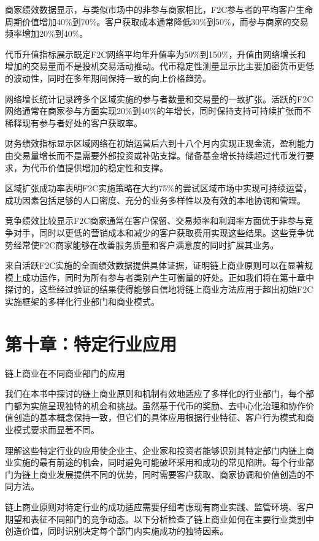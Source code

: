\documentclass[
  Letterpaper,
]{scrbook}
\begin{document}
商家绩效数据显示，与类似市场中的非参与商家相比，F2C参与者的平均客户生命周期价值增加40\%到70\%。客户获取成本通常降低30\%到50\%，而参与商家的交易频率增加20\%到40\%。

代币升值指标展示既定F2C网络平均年升值率为50\%到150\%，升值由网络增长和增加的交易量而不是投机交易活动推动。代币稳定性测量显示比主要加密货币更低的波动性，同时在多年期间保持一致的向上价格趋势。

网络增长统计记录跨多个区域实施的参与者数量和交易量的一致扩张。活跃的F2C网络通常在商家参与方面实现20\%到40\%的年增长，同时保持支持可持续扩张而不稀释现有参与者好处的客户获取率。

财务绩效指标显示区域网络在初始运营后六到十八个月内实现正现金流，盈利能力由交易量增长而不是需要外部投资或补贴支撑。储备基金增长持续超过代币发行要求，为代币价值提供增加的稳定性和支撑。

区域扩张成功率表明F2C实施策略在大约75\%的尝试区域市场中实现可持续运营，成功因素包括足够的人口密度、充分的业务多样性以及有效的本地协调和管理。

竞争绩效比较显示F2C商家通常在客户保留、交易频率和利润率方面优于非参与竞争对手，同时以更低的营销成本和减少的客户获取费用实现这些结果。这些竞争优势经常使F2C商家能够在改善服务质量和客户满意度的同时扩展其业务。

来自活跃F2C实施的全面绩效数据提供具体证据，证明链上商业原则可以在显著规模上成功运作，同时为所有参与者类别产生可衡量的好处。正如我们将在第十章中探讨的，这些经过验证的结果使得能够自信地将链上商业方法应用于超出初始F2C实施框架的多样化行业部门和商业模式。

\chapter{第十章：特定行业应用}\label{sec-industry-applications}

链上商业在不同商业部门的应用

我们在本书中探讨的链上商业原则和机制有效地适应了多样化的行业部门，每个部门都为实施呈现独特的机会和挑战。虽然基于代币的奖励、去中心化治理和协作价值创造的基本概念保持一致，但它们的具体应用根据行业特征、客户行为模式和商业模式要求而显著不同。

理解这些特定行业的应用使企业主、企业家和投资者能够识别其特定部门内链上商业实施的最有前途的机会，同时避免可能破坏采用和成功的常见陷阱。每个行业部门为链上商业发展提供不同的优势，同时需要客户获取、商家协调和价值创造的不同方法。

链上商业原则对特定行业的成功适应需要仔细考虑现有商业实践、监管环境、客户期望和表征不同部门的竞争动态。以下分析检查了链上商业如何在主要行业类别中创造价值，同时识别决定每个部门内实施成功的独特因素。
\end{document}
